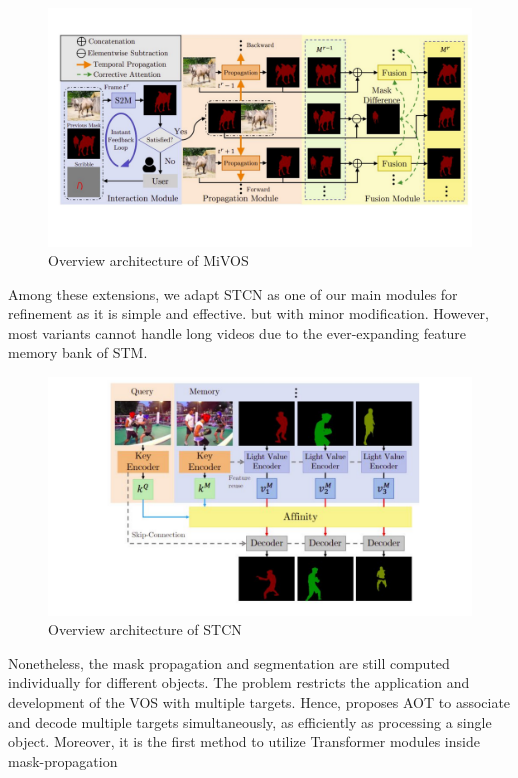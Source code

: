 \begin{figure}[!h]
    \centering
    \includegraphics[width=\textwidth]{content/resources/new_images/models/mivos.pdf}
    \caption{Overview architecture of MiVOS \cite{cheng2021mivos}}
    \label{fig:mivos}
\end{figure}

Among these extensions, we adapt STCN \cite{cheng2021stcn} as one of our main modules for refinement as it is simple and effective. but with minor modification. However, most variants cannot handle long videos due to the ever-expanding feature memory bank of STM.

\begin{figure}[!h]
    \centering
    \includegraphics[width=\textwidth]{content/resources/new_images/models/stcn.pdf}
    \caption{Overview architecture of STCN \cite{cheng2021stcn}}
    \label{fig:stcn}
\end{figure}

Nonetheless, the mask propagation and segmentation are still computed individually for different objects. The
problem restricts the application and development of the VOS with multiple targets. Hence,  \cite{yang2022associating} proposes AOT to associate and decode multiple targets simultaneously, as efficiently as processing a single object. Moreover, it is the first method to utilize Transformer modules inside mask-propagation


